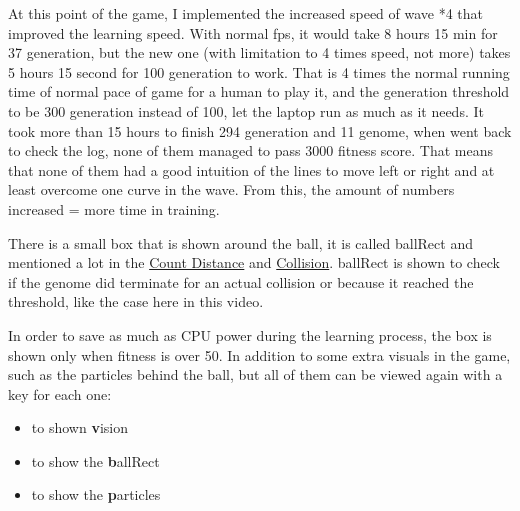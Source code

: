 At this point of the game, I implemented the increased speed of wave *4 that improved the learning speed. With normal fps, it would take 8 hours 15 min for 37 generation, but the new one (with limitation to 4 times speed, not more) takes 5 hours 15 second for 100 generation to work. That is 4 times the normal running time of normal pace of game for a human to play it, and the generation threshold to be 300 generation instead of 100, let the laptop run as much as it needs. It took more than 15 hours to finish 294 generation and 11 genome, when went back to check the log, none of them managed to pass 3000 fitness score. That means that none of them had a good intuition of the lines to move left or right and at least overcome one curve in the wave. From this, the amount of numbers increased = more time in training.

There is a small box that is shown around the ball, it is called ballRect and mentioned a lot in the \hyperref[sec:count-distance]{Count Distance} and \hyperref[sec:collision]{Collision}. ballRect is shown to check if the genome did terminate for an actual collision or because it reached the threshold, like the case here in this video.

In order to save as much as CPU power during the learning process, the box is shown only when fitness is over 50. In addition to some extra visuals in the game, such as the particles behind the ball, but all of them can be viewed again with a key for each one:
\begin{itemize}
	\item {} to shown \textbf{v}ision
	\item {} to show the \textbf{b}allRect
	\item {} to show the \textbf{p}articles
\end{itemize}